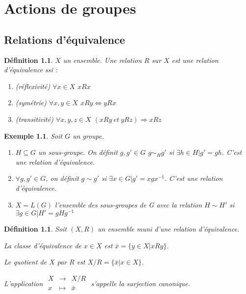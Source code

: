\documentclass[a4paper, oneside]{report}
\theoremstyle{break}
\newtheorem{defi}[thm]{Définition}
\newtheorem{exem}[thm]{Exemple}
\begin{document}
\chapter{Actions de groupes}

\section{Relations d'équivalence}

\begin{defi}
	$X$ un ensemble. Une relation $R$ sur $X$ est une relation d'équivalence ssi :
	\begin{enumerate}
		\item (réflexivité) $\forall x\in X$ $xRx$
		\item (symétrie) $\forall x,y\in X$ $xRy\Leftrightarrow yRx$
		\item (transitivité) $\forall x,y,z\in X$ $(xRy~et~yRz)\Rightarrow xRz$
	\end{enumerate}
\end{defi}

\begin{exem}
	Soit $G$ un groupe.
	\begin{enumerate}
		\item $H\subseteq G$ un sous-groupe. On définit $g,g'\in G$ $g\sim_Hg'$ si $\exists h\in H | g'=gh$. C'est une relation d'équivalence.
		\item $\forall g,g'\in G$, on définit $g\sim g'$ si $\exists x\in G | g'=xgx^{-1}$. C'est une relation d'équivalence.
		\item $X=L(G)$ l'ensemble des sous-groupes de G avec la relation $H\sim H'$ si $\exists g\in G | H'=gHg^{-1}$
	\end{enumerate}
\end{exem}

\begin{defi}
	Soit $(X,R)$ un ensemble muni d'une relation d'équivalence.
	
	La classe d'équivalence de $x\in X$ est $\bar{x}=\{y\in X | xRy \}$.
	
	Le quotient de $X$ par $R$ est $X/R=\{\bar{x} | x\in X \}$.
	
	L'application $\begin{array}{lll}
	X&\rightarrow& X/R\\
	x&\mapsto&\bar{x}\\
	\end{array}$ s'appelle la surjection canonique.
\end{defi}
\end{document}
